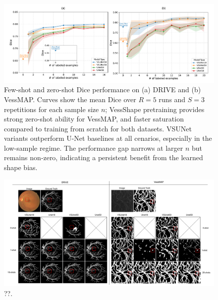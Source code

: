 \documentclass[%
reprint,
nofootinbib,
 amsmath,amssymb,
aps,
superscriptaddress,
showkeys,
longbibliography
]{revtex4-1}
\begin{document}
\begin{figure}[tbp]
    \centering
    \includegraphics[width=\textwidth]{figures/results/results_charts.pdf}
    \caption{Few-shot and zero-shot Dice performance on (a) DRIVE and (b) VessMAP. Curves show the mean Dice over $R{=}5$ runs and $S{=}3$ repetitions for each sample size $n$; VessShape pretraining provides strong zero-shot ability for VessMAP, and faster saturation compared to training from scratch for both datasets. VSUNet variants outperform U-Net baselines at all cenarios, especially in the low-sample regime. The performance gap narrows at larger $n$ but remains non‑zero, indicating a persistent benefit from the learned shape bias.}
    \label{f:results_charts}
\end{figure}


\begin{figure}[tbp]
    \centering
    \includegraphics[width=\textwidth]{figures/results/results_fewshots.pdf}
    \caption{??.}
    \label{f:results_fewshots_drive}
\end{figure}




\end{document}
